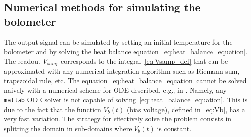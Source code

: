 \subsection{Numerical methods for simulating the bolometer}
The output signal can be simulated by setting an initial temperature for the bolometer and by solving the heat balance equation~\eqref{eq:heat_balance_equation}. The readout $V_{samp}$ corresponds to the integral~\eqref{eq:Vsamp_def} that can be approximated with any numerical integration algorithm such as Riemann sum, trapezoidal rule, etc. The equation~\eqref{eq:heat_balance_equation} cannot be solved naively with a numerical scheme for ODE described, e.g., in \cite{mattheij1996ordinary,ascher1998computer}. Namely, any \texttt{matlab} ODE solver is not capable of solving~\eqref{eq:heat_balance_equation}. This is due to the fact that the function $V_b(t)$ (bias voltage), defined in~\eqref{eq:Vb}, has a very fast variation. The strategy for effectively solve the problem consists in splitting the domain in sub-domains where $V_b(t)$ is constant.

